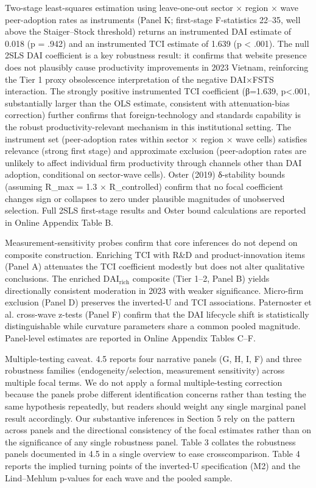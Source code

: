 \documentclass[12pt,a4paper]{article}
\begin{document}
Two-stage least-squares estimation using leave-one-out sector × region ×
wave peer-adoption rates as instruments (Panel K; first-stage
F-statistics 22--35, well above the Staiger--Stock threshold) returns an
instrumented DAI estimate of 0.018 (p = .942) and an instrumented TCI
estimate of 1.639 (p \textless{} .001). The null 2SLS DAI coefficient is
a key robustness result: it confirms that website presence does not
plausibly cause productivity improvements in 2023 Vietnam, reinforcing
the Tier 1 proxy obsolescence interpretation of the negative DAI×FSTS
interaction. The strongly positive instrumented TCI coefficient
(β=1.639, p\textless.001, substantially larger than the OLS estimate,
consistent with attenuation-bias correction) further confirms that
foreign-technology and standards capability is the robust
productivity-relevant mechanism in this institutional setting. The
instrument set (peer-adoption rates within sector × region × wave cells)
satisfies relevance (strong first stage) and approximate exclusion
(peer-adoption rates are unlikely to affect individual firm productivity
through channels other than DAI adoption, conditional on sector-wave
cells). Oster (2019) δ-stability bounds (assuming R\_max = 1.3 ×
R\_controlled) confirm that no focal coefficient changes sign or
collapses to zero under plausible magnitudes of unobserved selection.
Full 2SLS first-stage results and Oster bound calculations are reported
in Online Appendix Table B.

Measurement-sensitivity probes confirm that core inferences do not
depend on composite construction. Enriching TCI with R\&D and
product-innovation items (Panel A) attenuates the TCI coefficient
modestly but does not alter qualitative conclusions. The enriched
\(\mathrm{DAI}_{\text{rich}}\) composite (Tier 1--2, Panel B) yields
directionally consistent moderation in 2023 with weaker significance.
Micro-firm exclusion (Panel D) preserves the inverted-U and TCI
associations. Paternoster et al. cross-wave z-tests (Panel F) confirm
that the DAI lifecycle shift is statistically distinguishable while
curvature parameters share a common pooled magnitude. Panel-level
estimates are reported in Online Appendix Tables C--F.

Multiple-testing caveat. 4.5 reports four narrative panels (G, H, I, F)
and three robustness families (endogeneity/selection, measurement
sensitivity) across multiple focal terms. We do not apply a formal
multiple-testing correction because the panels probe different
identification concerns rather than testing the same hypothesis
repeatedly, but readers should weight any single marginal panel result
accordingly. Our substantive inferences in Section 5 rely on the pattern
across panels and the directional consistency of the focal estimates
rather than on the significance of any single robustness panel. Table 3
collates the robustness panels documented in 4.5 in a single overview to
ease crosscomparison. Table 4 reports the implied turning points of the
inverted-U specification (M2) and the Lind--Mehlum p-values for each
wave and the pooled sample.
\end{document}
